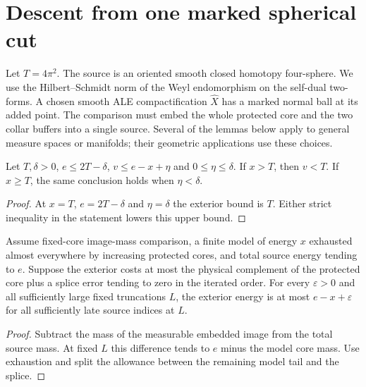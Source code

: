 \section{Descent from one marked spherical cut}

Let $T=4\pi^2$. The source is an oriented smooth closed homotopy
four-sphere. We use the Hilbert--Schmidt norm of the Weyl endomorphism
on the self-dual two-forms. A chosen smooth ALE compactification
$\widehat X$ has a marked normal ball at its added point. The comparison
must embed the whole protected core and the two collar buffers into a
single source. Several of the lemmas below apply to general measure
spaces or manifolds; their geometric applications use these choices.

\begin{lemma}
\label{lem:strict-exterior-margin}
\leanok
Let $T,\delta>0$, $e\le2T-\delta$, $v\le e-x+\eta$ and
$0\le\eta\le\delta$. If $x>T$, then $v<T$. If $x\ge T$, the
same conclusion holds when $\eta<\delta$.
\end{lemma}
\begin{proof}
\leanok
At $x=T$, $e=2T-\delta$ and $\eta=\delta$ the exterior bound is $T$.
Either strict inequality in the statement lowers this upper bound.
\end{proof}

\begin{lemma}
\label{lem:cut-core-complement}
\leanok
Assume fixed-core image-mass comparison, a finite model of energy $x$
exhausted almost everywhere by increasing protected cores, and total
source energy tending to $e$. Suppose the exterior costs at most the
physical complement of the protected core plus a splice error tending
to zero in the iterated order. For every $\varepsilon>0$ and all
sufficiently large fixed truncations $L$, the exterior energy is at most
$e-x+\varepsilon$ for all sufficiently late source indices at $L$.
\end{lemma}
\begin{proof}
\leanok
Subtract the mass of the measurable embedded image from the total
source mass. At fixed $L$ this difference tends to $e$ minus the model
core mass. Use exhaustion and split the allowance between the remaining
model tail and the splice.
\end{proof}

